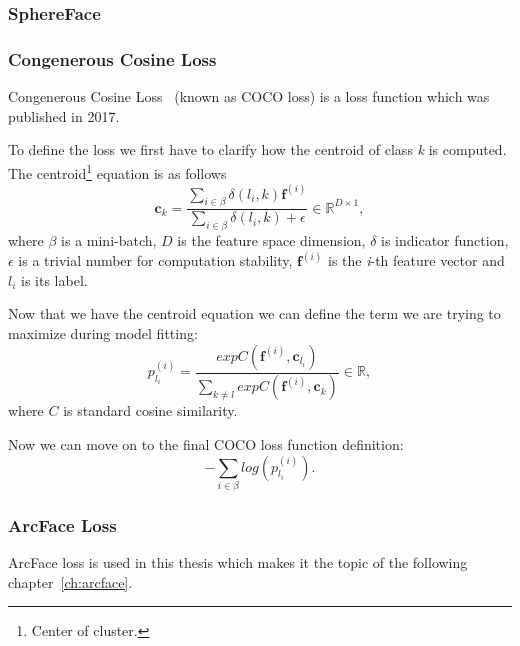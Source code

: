 \subsubsection{SphereFace}

\subsubsection{Congenerous Cosine Loss}
Congenerous Cosine Loss~\cite{CocoLoss} (known as COCO loss) is a loss function which was published in 2017.

To define the loss we first have to clarify how the centroid of class \textit{k} is computed.
The centroid\footnote{Center of cluster.} equation is as follows
\begin{equation}
    \boldsymbol{c}_{k} = \frac{\sum_{i \in \beta} \delta \left( l_i, k \right)\boldsymbol{f}^{(i)}}
    {\sum_{i \in \beta} \delta \left( l_i, k \right) + \epsilon} \in \mathbb{R}^{D \times 1},
\end{equation}
where $\beta$ is a mini-batch, $D$ is the feature space dimension, $\delta$ is indicator function, $\epsilon$ is a
trivial number for computation stability, $\boldsymbol{f}^{(i)}$ is the \textit{i}-th feature vector and $l_i$ is
its label.

Now that we have the centroid equation we can define the term we are trying to maximize during model fitting:
\begin{equation}
    p_{l_i}^{(i)} = \frac{exp C(\boldsymbol{f}^{(i)}, \boldsymbol{c}_{l_{i}})}
    {\sum_{k \neq l} exp C(\boldsymbol{f}^{(i)}, \boldsymbol{c}_{k})} \in \mathbb{R},
\end{equation}
where $C$ is standard cosine similarity.

Now we can move on to the final COCO loss function definition:
\begin{equation}
    - \sum_{i \in \beta} log \left( p_{l_i}^{(i)} \right).
\end{equation}


\subsubsection{ArcFace Loss}\label{subsubsec:arcface}
ArcFace loss is used in this thesis which makes it the topic of the following chapter~\ref{ch:arcface}.